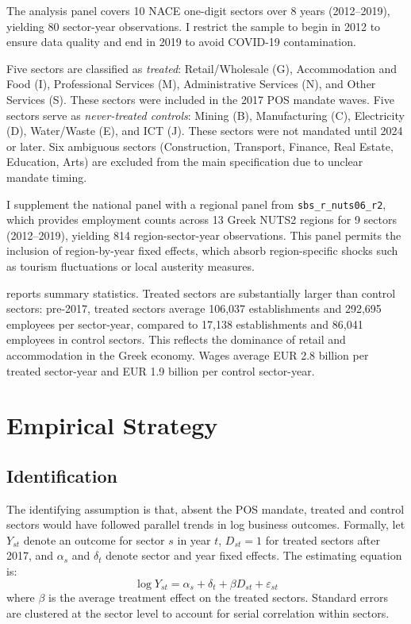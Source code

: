 \documentclass[12pt]{article}
\begin{document}
The analysis panel covers 10 NACE one-digit sectors over 8 years (2012--2019), yielding 80 sector-year observations. I restrict the sample to begin in 2012 to ensure data quality and end in 2019 to avoid COVID-19 contamination.

Five sectors are classified as \textit{treated}: Retail/Wholesale (G), Accommodation and Food (I), Professional Services (M), Administrative Services (N), and Other Services (S). These sectors were included in the 2017 POS mandate waves. Five sectors serve as \textit{never-treated controls}: Mining (B), Manufacturing (C), Electricity (D), Water/Waste (E), and ICT (J). These sectors were not mandated until 2024 or later. Six ambiguous sectors (Construction, Transport, Finance, Real Estate, Education, Arts) are excluded from the main specification due to unclear mandate timing.

I supplement the national panel with a regional panel from \texttt{sbs\_r\_nuts06\_r2}, which provides employment counts across 13 Greek NUTS2 regions for 9 sectors (2012--2019), yielding 814 region-sector-year observations. This panel permits the inclusion of region-by-year fixed effects, which absorb region-specific shocks such as tourism fluctuations or local austerity measures.



 reports summary statistics. Treated sectors are substantially larger than control sectors: pre-2017, treated sectors average 106,037 establishments and 292,695 employees per sector-year, compared to 17,138 establishments and 86,041 employees in control sectors. This reflects the dominance of retail and accommodation in the Greek economy. Wages average EUR 2.8 billion per treated sector-year and EUR 1.9 billion per control sector-year.


\section{Empirical Strategy}

\subsection{Identification}

The identifying assumption is that, absent the POS mandate, treated and control sectors would have followed parallel trends in log business outcomes. Formally, let $Y_{st}$ denote an outcome for sector $s$ in year $t$, $D_{st} = 1$ for treated sectors after 2017, and $\alpha_s$ and $\delta_t$ denote sector and year fixed effects. The estimating equation is:
\begin{equation}
\log Y_{st} = \alpha_s + \delta_t + \beta D_{st} + \varepsilon_{st}
\label{eq:twfe}
\end{equation}
where $\beta$ is the average treatment effect on the treated sectors. Standard errors are clustered at the sector level to account for serial correlation within sectors.
\end{document}
